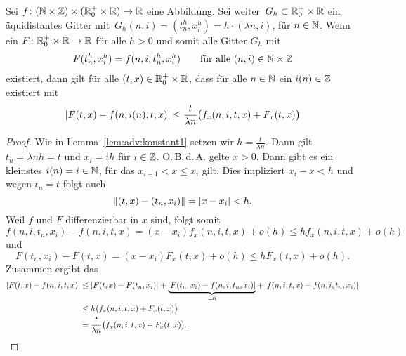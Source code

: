 \begin{lemma}
Sei $f\colon (\mathbb N \times \mathbb Z) \times (\mathbb R^+_0 \times \mathbb R) \to \mathbb R$ eine Abbildung.
Sei weiter\, $G_h \subset \mathbb R^+_0 \times \mathbb R$ ein äquidistantes Gitter mit\, $G_h(n,i) = (t^h_n, x^h_i) = h \cdot (\lambda n, i)$, für $n \in \mathbb N$.
Wenn ein $F\colon \mathbb R^+_0 \times \mathbb R \to \mathbb R$ für alle $h > 0$ und somit alle Gitter $G_h$ mit
\begin{align}\label{eq:lemma:diag:voraussetzung}
F(t^h_n, x^h_i) = f(n, i, t^h_n, x^h_i) \qquad \text{für alle $(n,i) \in \mathbb N \times \mathbb Z$}
\end{align}
existiert, dann gilt für alle $(t, x) \in \mathbb R^+_0 \times \mathbb R$, dass für alle $n \in \mathbb N$ ein $i(n) \in \mathbb Z$ existiert mit
\begin{align}\label{eq:lemma:diag:aussage}
\left| F(t, x) - f(n, i(n), t, x) \right| \leq \frac {t}{\lambda n} \bigl(f_x(n, i, t, x) + F_x(t, x) \bigr)
\end{align}
\end{lemma}
\begin{proof}
Wie in Lemma~\ref{lem:adv:konstant1} setzen wir $h = \frac {t}{\lambda n}$.
Dann gilt $t_n = \lambda n h = t$ und $x_i = i h$ für $i \in \mathbb Z$.
O.\,B.\,d.\,A. gelte $x > 0$.
Dann gibt es ein kleinstes $i(n) = i \in \mathbb N$, für das $x_{i-1} < x \leq x_i$ gilt.
Dies impliziert $x_i - x < h$ und wegen $t_n = t$ folgt auch
\[ \left\lVert (t,x) - (t_n, x_i) \right\rVert = \left| x - x_i \right| < h. \]
Weil $f$ und $F$ differenzierbar in $x$ sind, folgt somit
\[ f(n, i, t_n, x_i) - f(n, i, t, x) = (x - x_i) f_x(n, i, t, x) + o(h) \leq h f_x(n, i, t, x) + o(h) \]
und
\[ F(t_n, x_i) - F(t, x) = (x - x_i) F_x(t, x) + o(h) \leq h F_x(t, x) + o(h). \]
Zusammen ergibt das
{\small
\begin{align*}
\left| F(t,x) - f(n, i, t, x) \right| &\leq \left| F(t, x) - F(t_n, x_i) \right| + \underbrace{\left| F(t_n, x_i) - f(n, i, t_n, x_i) \right|}_{= 0} + \left| f(n,i, t, x) - f(n, i, t_n, x_i) \right|\\
&\leq h \bigl(f_x(n, i, t, x) + F_x(t, x) \bigr)\\
&= \frac {t}{\lambda n} \bigl(f_x(n, i, t, x) + F_x(t, x) \bigr). \qedhere
\end{align*}
}
\end{proof}